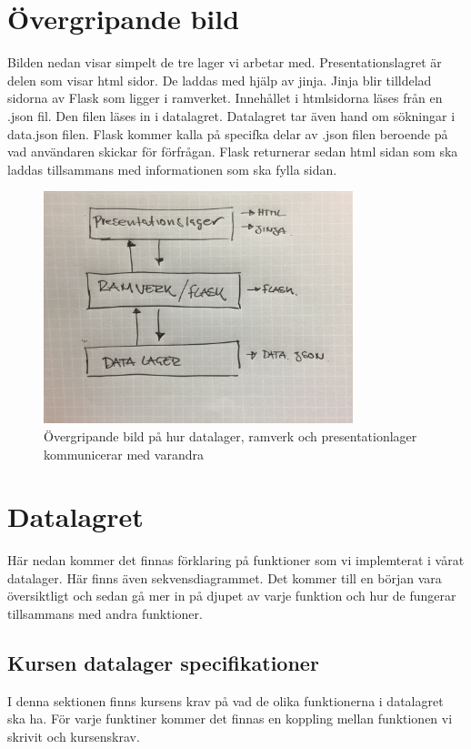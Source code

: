 \documentclass{TDP003mall}
\begin{document}
\section{Övergripande bild}
Bilden nedan visar simpelt de tre lager vi arbetar med. Presentationslagret är delen som visar html sidor. De laddas med hjälp av jinja. Jinja blir tilldelad sidorna av Flask som ligger i ramverket. Innehållet i htmlsidorna läses från en .json fil. Den filen läses in i datalagret. Datalagret tar även hand om sökningar i data.json filen. Flask kommer kalla på specifka delar av .json filen beroende på vad användaren skickar för förfrågan. Flask returnerar sedan html sidan som ska laddas tillsammans med informationen som ska fylla sidan.

\begin{figure}[ht!]
\centering
\includegraphics[width=90mm]{overgr.jpg}
\caption{Övergripande bild på hur datalager, ramverk och presentationlager kommunicerar med varandra}\label{overgr}
\end{figure}
\pagebreak

\section{Datalagret}
Här nedan kommer det finnas förklaring på funktioner som vi implemterat i vårat datalager. Här finns även sekvensdiagrammet. Det kommer till en början vara översiktligt och sedan gå mer in på djupet av varje funktion och hur de fungerar tillsammans med andra funktioner.

\subsection{Kursen datalager specifikationer}
I denna sektionen finns kursens krav på vad de olika funktionerna i datalagret ska ha. För varje funktiner kommer det finnas en koppling mellan funktionen vi skrivit och kursenskrav.
\end{document}
